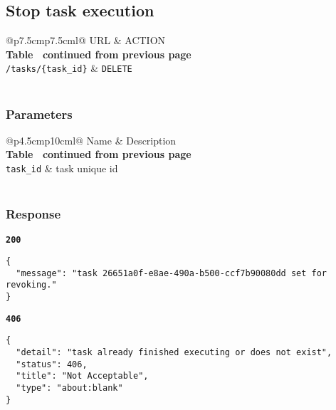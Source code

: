 \subsection{Stop task execution}

\begin{longtable}[c]{@{}p{7.5cm}p{7.5cm}l@{}}
  \toprule
  URL                          & ACTION                       \\* \midrule
  \endfirsthead
  \multicolumn{3}{c}%
  {{\bfseries Table \thetable\ continued from previous page}} \\
  \endhead
  \bottomrule
  \endfoot
  \endlastfoot
  \texttt{/tasks/\{task\_id\}} & \texttt{DELETE}              \\* \bottomrule
  \label{tab:rdf-validator-delete-task}                       \\
\end{longtable}

\subsubsection{Parameters}
\begin{longtable}[c]{@{}p{4.5cm}p{10cm}l@{}}
  \toprule
  Name              & Description                             \\* \midrule
  \endfirsthead
  \multicolumn{3}{c}%
  {{\bfseries Table \thetable\ continued from previous page}} \\
  \endhead
  \bottomrule
  \endfoot
  \endlastfoot
  \texttt{task\_id} & task unique id                          \\* \bottomrule
  \label{tab:rdf-validator-delete-task-parameters}            \\
\end{longtable}

\subsubsection{Response}
\textbf{\texttt{200}}
\begin{lstlisting}
{
  "message": "task 26651a0f-e8ae-490a-b500-ccf7b90080dd set for revoking."
}
\end{lstlisting}

\textbf{\texttt{406}}
\begin{lstlisting}
{
  "detail": "task already finished executing or does not exist",
  "status": 406,
  "title": "Not Acceptable",
  "type": "about:blank"
}
\end{lstlisting}